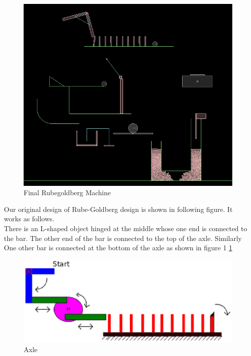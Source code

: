 \documentclass[a4paper,11pt]{article}
\begin{document}
{\newpage
\begin{figure}[h]
    \centering
    \includegraphics[scale=0.6]{final_rg}
    \caption{Final Rubegoldberg Machine}
\end{figure}
\newpage

\indent \indent Our original design of Rube-Goldberg design is shown in following figure. It works as follows. \\
\indent There is an L-shaped object hinged at the middle whose one end is connected to the bar. The other end of the bar is connected to the top of the axle. Similarly One other bar is connected at the bottom of the axle as shown in figure 1 \ref{fig:trigger}\\

\begin{figure}[h]
    \centering
    \label{fig:trigger}
    \includegraphics[scale=0.6]{trigger}
    \caption{Axle}
\end{figure}

}
\end{document}
